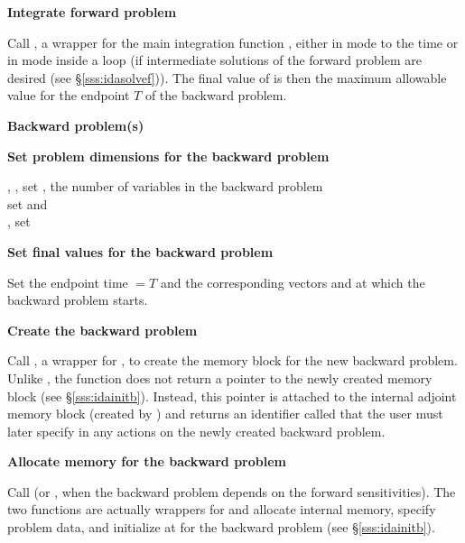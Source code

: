 \begin{Steps}
\item
  {\bf Integrate forward problem}

  Call , a wrapper for the {\idas} main integration
  function , either in  mode to the time 
   or in  mode inside a loop (if intermediate
  solutions of the forward problem are desired (see \S\ref{sss:idasolvef})).
  The final value of  is then the maximum allowable value for
  the endpoint $T$ of the backward problem.

  \vspace{0.2in}\centerline{\bf Backward problem(s)}

 \item \label{i:back_start}
   {\bf Set problem dimensions for the backward problem}
   
   {\s, \omp, \pt} set , the number of variables in the backward problem \\
   {\p} set  and \\
   {\omp, \pt} set 

\item
  {\bf Set final values for the backward problem}

  Set the endpoint time  $= T$ and the corresponding vectors 
  and  at which the backward problem starts.

\item
  {\bf Create the backward problem}

  Call , a wrapper for , to create the
  {\idas} memory block for the new backward problem. Unlike , 
  the function  does not return a pointer to the newly created 
  memory block (see \S\ref{sss:idainitb}). Instead, this pointer is attached to 
  the internal adjoint memory  block (created by ) and returns an
  identifier called  that the user must later specify in any actions on
  the newly created backward problem.

\item
  {\bf Allocate memory for the backward problem}

  Call  (or , when the backward problem depends on the
  forward sensitivities). The two functions are actually wrappers for  
  and allocate internal memory, specify problem data, and initialize {\idas} 
  at  for the backward problem (see \S\ref{sss:idainitb}).


\end{Steps}
